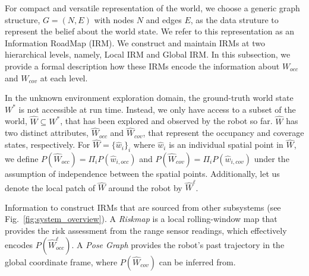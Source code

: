 \documentclass[letterpaper]{article} %
\newcommand{\phdone}[1]{} %
\begin{document}
\phdone{Data structure}
For compact and versatile representation of the world, we choose a generic graph structure, $G = (N, E)$ with nodes $N$ and edges $E$, as the data struture to represent the belief about the world state.
We refer to this representation as an Information RoadMap (IRM).
We construct and maintain IRMs at two hierarchical levels, namely, Local IRM and Global IRM.
In this subsection, we provide a formal description how these IRMs encode the information about $W_{occ}$ and $W_{cov}$ at each level.


\phdone{Formulation}
In the unknown environment exploration domain, the ground-truth world state $W^*$ is not accessible at run time.
Instead, we only have access to a subset of the world, $\hat{W} \subseteq W^*$, that has been explored and observed by the robot so far.
$\hat{W}$ has two distinct attributes, $\hat{W}_{occ}$ and $\hat{W}_{cov}$, that represent the occupancy and coverage states, respectively.
%
For $\hat{W} = \{\hat{w}_i\}_i$ where $\hat{w}_i$ is an individual spatial point in $\hat{W}$, we define $P(\hat{W}_{occ}) = \Pi_i P(\hat{w}_{i,occ})$ and $P(\hat{W}_{cov}) = \Pi_i P(\hat{w}_{i,cov})$ under the assumption of independence between the spatial points.
Additionally, let us denote the local patch of $\hat{W}$ around the robot by $\hat{W}^\ell$.
%
%


\phdone{Information Sources}
Information to construct IRMs that are sourced from other subsystems (see Fig.~\ref{fig:system_overview}).
A \textit{Riskmap} is a local rolling-window map that provides the risk assessment from the range sensor readings, %
which effectively encodes $P(\hat{W}^\ell_{occ})$.
A \textit{Pose Graph} %
provides the robot's past trajectory in the global coordinate frame, where $P(\hat{W}_{cov})$ can be inferred from.
\end{document}
